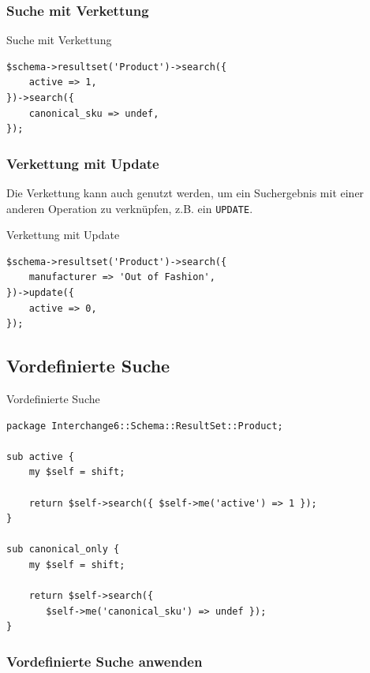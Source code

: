 \subsubsection{Suche mit Verkettung}

\begin{frame}[fragile]{Suche mit Verkettung}
\begin{lstlisting}
$schema->resultset('Product')->search({
    active => 1,
})->search({
    canonical_sku => undef,
});
\end{lstlisting}
\end{frame}

\subsubsection{Verkettung mit Update}

Die Verkettung kann auch genutzt werden, um
ein Suchergebnis mit einer anderen Operation zu
verknüpfen, z.B. ein \verb|UPDATE|.

\begin{frame}[fragile]{Verkettung mit Update}
\begin{lstlisting}
$schema->resultset('Product')->search({
    manufacturer => 'Out of Fashion',
})->update({
    active => 0,
});
\end{lstlisting}
\end{frame}

\subsection{Vordefinierte Suche}

\begin{frame}[fragile]{Vordefinierte Suche}
\begin{lstlisting}
package Interchange6::Schema::ResultSet::Product;

sub active {
    my $self = shift;

    return $self->search({ $self->me('active') => 1 });
}

sub canonical_only {
    my $self = shift;

    return $self->search({ 
       $self->me('canonical_sku') => undef });
}

\end{lstlisting}
\end{frame}

\subsubsection{Vordefinierte Suche anwenden}

